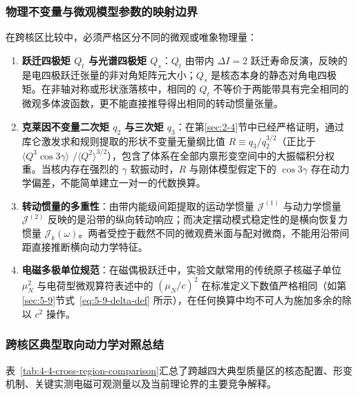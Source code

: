 \subsubsection{物理不变量与微观模型参数的映射边界}

在跨核区比较中，必须严格区分不同的微观或唯象物理量：
\begin{enumerate}
\item \textbf{跃迁四极矩 $Q_t$ 与光谱四极矩 $Q_s$}：$Q_t$ 由带内 $\Delta I = 2$ 跃迁寿命反演，反映的是电四极跃迁张量的非对角矩阵元大小；$Q_s$ 是核态本身的静态对角电四极矩。在非轴对称或形状涨落核中，相同的 $Q_t$ 不等价于两能带具有完全相同的微观多体波函数，更不能直接推导得出相同的转动惯量张量。
\item \textbf{克莱因不变量二次矩 $q_2$ 与三次矩 $q_3$}：在第\ref{sec:2-4}节中已经严格证明，通过库仑激发求和规则提取的形状不变量无量纲比值 $R \equiv q_3 / q_2^{3/2}$（正比于 $\langle Q^3 \cos 3\gamma \rangle$ $/ \langle Q^2 \rangle^{3/2}$），包含了体系在全部内禀形变空间中的大振幅积分权重。当核内存在强烈的 $\gamma$ 软振动时，$R$ 与刚体模型假定下的 $\cos 3\gamma$ 存在动力学偏差，不能简单建立一对一的代数换算。
\item \textbf{转动惯量的多重性}：由带内能级间距提取的运动学惯量 $\mathcal{J}^{(1)}$ 与动力学惯量 $\mathcal{J}^{(2)}$ 反映的是沿带的纵向转动响应；而决定摆动模式稳定性的是横向恢复力惯量 $\mathcal{J}_k(\omega)$。两者受控于截然不同的微观费米面与配对微商，不能用沿带间距直接推断横向动力学特征。
\item \textbf{电磁多极单位规范}：在磁偶极跃迁中，实验文献常用的传统原子核磁子单位 $\mu_N^2$ 与电荷型微观算符表述中的 $(\mu_N/c)^2$ 在标准定义下数值严格相同（如第\ref{sec:5-9}节式~\eqref{eq:5-9-delta-def} 所示），在任何换算中均不可人为施加多余的除以 $c^2$ 操作。
\end{enumerate}

\subsubsection{跨核区典型取向动力学对照总结}

表~\ref{tab:4-4-cross-region-comparison}汇总了跨越四大典型质量区的核态配置、形变机制、关键实测电磁可观测量以及当前理论界的主要竞争解释。


